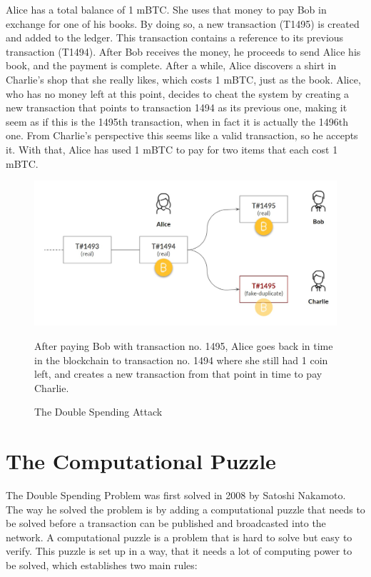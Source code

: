 \documentclass[a4paper, 12pt]{report}
\begin{document}
\par Alice has a total balance of 1 mBTC. She uses that money to pay Bob in exchange for one of his books. By doing so, a new transaction (T1495) is created and added to the ledger. This transaction contains a reference to its previous transaction (T1494). After Bob receives the money, he proceeds to send Alice his book, and the payment is complete. After a while, Alice discovers a shirt in Charlie’s shop that she really likes, which costs 1 mBTC, just as the book. Alice, who has no money left at this point, decides to cheat the system by creating a new transaction that points to transaction 1494 as its previous one, making it seem as if this is the 1495th transaction, when in fact it is actually the 1496th one. From Charlie’s perspective this seems like a valid transaction, so he accepts it. With that, Alice has used 1 mBTC to pay for two items that each cost 1 mBTC.

\begin{figure}[h]
	\includegraphics[width=\textwidth]{03_Double_Spend}
	\caption{The Double Spending Attack}
	\medskip
	\small After paying Bob with transaction no. 1495, Alice goes back in time in the blockchain to transaction no. 1494 where she still had 1 coin left, and creates a new transaction from that point in time to pay Charlie.
	\label{fig:03_Double_Spend}
\end{figure}

\section{The Computational Puzzle}\label{chap:The_Computational_Puzzle}

\par The Double Spending Problem was first solved in 2008 by Satoshi Nakamoto. The way he solved the problem is by adding a computational puzzle that needs to be solved before a transaction can be published and broadcasted into the network. A computational puzzle is a problem that is hard to solve but easy to verify. This puzzle is set up in a way, that it needs a lot of computing power to be solved, which establishes two main rules:
\end{document}
